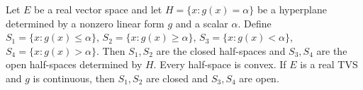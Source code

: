 Let $E$ be a real vector space and let $H = \{x : g(x) = \alpha\}$ be a hyperplane determined by a nonzero linear form $g$ and a scalar $\alpha$. Define $S_1 = \{x : g(x) \leq \alpha\}$, $S_2 = \{x : g(x) \geq \alpha\}$, $S_3 = \{x : g(x) < \alpha\}$, $S_4 = \{x : g(x) > \alpha\}$. Then $S_1, S_2$ are the closed half-spaces and $S_3, S_4$ are the open half-spaces determined by $H$. Every half-space is convex. If $E$ is a real TVS and $g$ is continuous, then $S_1, S_2$ are closed and $S_3, S_4$ are open.